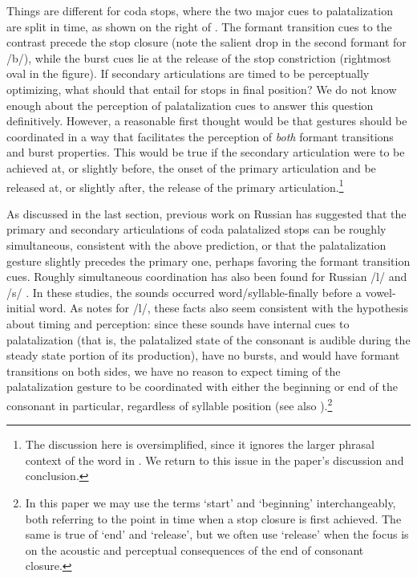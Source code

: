 \documentclass[output=paper,colorlinks,citecolor=brown]{langscibook}
\newcommand{\pal}{\ipa{ʲ}}
\newcommand{\vel}{\ipa{ˠ}}
\begin{document}
Things are different for coda stops, where the two major cues to palatalization are split in time, as shown on the right of . The formant transition cues to the contrast precede the stop closure (note the salient drop in the second formant for /b\vel/), while the burst cues lie at the release of the stop constriction (rightmost oval in the figure). If secondary articulations are timed to be perceptually optimizing, what should that entail for stops in final position? We do not know enough about the perception of palatalization cues to answer this question definitively. However, a reasonable first thought would be that gestures should be coordinated in a way that facilitates the perception of \emph{both} formant transitions and burst properties. This would be true if the secondary articulation were to be achieved at, or slightly before, the onset of the primary articulation and be released at, or slightly after, the release of the primary articulation.\footnote{The discussion here is oversimplified, since it ignores the larger phrasal context of the word in . We return to this issue in the paper's discussion and conclusion.}

As discussed in the last section, previous work on Russian has suggested that the primary and secondary articulations of coda palatalized stops can be roughly simultaneous, consistent with the above prediction, or that the palatalization gesture slightly precedes the primary one, perhaps favoring the formant transition cues. Roughly simultaneous coordination has also been found for Russian /l\pal/ \citep{Kochetov:2005} and /s\pal/ \citep{Kochetov2009_Russian_C_variation}. In these studies, the sounds occurred word\slash syllable\hyp finally before a vowel-initial word. As \citet{Kochetov:2005} notes for /l\pal/, these facts also seem consistent with the hypothesis about timing and perception: since these sounds have internal cues to palatalization (that is, the palatalized state of the consonant is audible during the steady state portion of its production), have no bursts, and would have formant transitions on both sides, we have no reason to expect timing of the palatalization gesture to be coordinated with either the beginning or end of the consonant in particular, regardless of syllable position (see also \citealt{Gick_etal:2006_liquids}).\footnote{In this paper we may use the terms `start' and `beginning' interchangeably, both referring to the point in time when a stop closure is first achieved. The same is true of `end' and `release', but we often use `release' when the focus is on the acoustic and perceptual consequences of the end of consonant closure.} 
\end{document}
